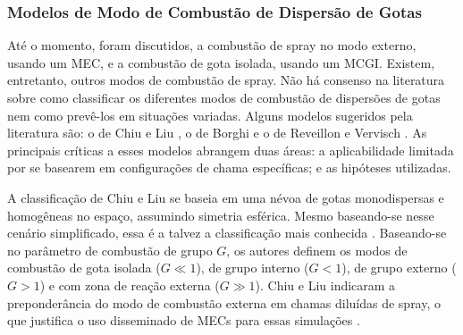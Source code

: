 \subsubsection{Modelos de Modo de Combustão de Dispersão de Gotas}

Até o momento, foram discutidos, a combustão de spray no modo externo, usando um MEC, e a combustão de gota isolada, usando um MCGI.
Existem, entretanto, outros modos de combustão de spray.
Não há consenso na literatura sobre como classificar os diferentes modos de combustão de dispersões de gotas nem como prevê-los em situações variadas.
Alguns modelos sugeridos pela literatura são: o de Chiu e Liu \cite{ChiuH1977,ChiuH1982}, o de Borghi \cite{Borghi1996} e o de Reveillon e Vervisch \cite{ReveillonJ2005}.
As principais críticas a esses modelos abrangem duas áreas: a aplicabilidade limitada por se basearem em configurações de chama específicas; e as hipóteses utilizadas. 

A classificação de Chiu e Liu \cite{ChiuH1977,ChiuH1982} se baseia em uma névoa de gotas monodispersas e homogêneas no espaço, assumindo simetria esférica.
Mesmo baseando-se nesse cenário simplificado, essa é a talvez a classificação mais conhecida \cite{JennyB2012}.
Baseando-se no parâmetro de combustão de grupo $G$, os autores definem  os modos de combustão de gota isolada ($G\ll1$), de grupo interno ($G<1$), de grupo externo ($G>1$) e com zona de reação externa ($G\gg1$).
Chiu e Liu \cite{ChiuH1982} indicaram a preponderância do modo de combustão externa em chamas diluídas de spray, o que justifica o uso disseminado de MECs para essas simulações \cite{SacomanoF2017PhD}.



